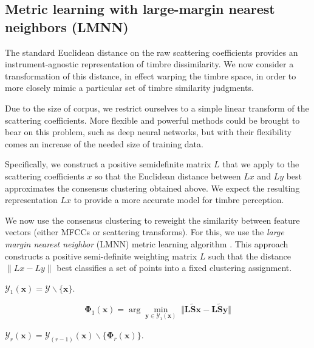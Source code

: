 \documentclass{bmcart}
\begin{document}
\subsection*{Metric learning with large-margin nearest neighbors (LMNN)}
\label{sec:weighting}

The standard Euclidean distance on the raw scattering coefficients provides an instrument-agnostic representation of timbre dissimilarity.
We now consider a transformation of this distance, in effect warping the timbre space, in order to more closely mimic a particular set of timbre similarity judgments.

Due to the size of corpus, we restrict ourselves to a simple linear transform of the scattering coefficients. More flexible and powerful methods could be brought to bear on this problem, such as deep neural networks, but with their flexibility comes an increase of the needed size of training data.

Specifically, we construct a positive semidefinite matrix $L$ that we apply to the scattering coefficients $x$ so that the Euclidean distance between $Lx$ and $Ly$ best approximates the consensus clustering obtained above.
We expect the resulting representation $Lx$ to provide a more accurate model for timbre perception.

We now use the consensus clustering to reweight the similarity between feature vectors (either MFCCs or scattering transforms).
For this, we use the \emph{large margin nearest neighbor} (LMNN) metric learning algorithm \cite{weinberger2006distance, weinberger2009distance}.
This approach constructs a positive semi-definite weighting matrix $L$ such that the distance $\|Lx - Ly\|$ best classifies a set of points into a fixed clustering assignment.

$\mathcal{Y}_1 (\boldsymbol{x}) = \mathcal{Y} \backslash \lbrace \boldsymbol{x} \rbrace$.

\begin{equation}
\mathbf{\Phi}_1 (\boldsymbol{x}) =
\arg \min_{\boldsymbol{y}\in \mathcal{Y}_1(\boldsymbol{x})}
\;
\big\Vert
\mathbf{L}\mathbf{\widetilde{S}}\boldsymbol{x}
-
\mathbf{L}\mathbf{\widetilde{S}}\boldsymbol{y}
\big\Vert
\end{equation}

$\mathcal{Y}_{r} (\boldsymbol{x}) = \mathcal{Y}_{(r-1)}(\boldsymbol{x}) \backslash \lbrace \mathbf{\Phi}_r (\boldsymbol{x}) \rbrace$.
\end{document}
